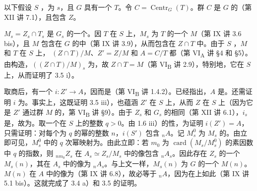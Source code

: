 以下假设 $S$ ，为 $s$，且 $G$ 具有一个 $T$。令 $C=\operatorname{Centr}_G(T)$。群 $C$ 是 $G$ 的（第 XII 讲 7.1），且包含 $Z$。

 $M_s=Z_s\cap T_s$ 是 $G_s$ 的一个。因 $T$ 在 $S$ 上，$M_s$ 为 $T$ 的一个 $M$（第 IX 讲 3.6 bis），且 $M$ 包含在 $G$ 的中（第 IX 讲 3.9），从而包含在 $Z\cap T$ 中。由于 $S$ ，$M$ 和 $T$ 在 $S$ 上， $(Z\cap T)/M$、$Z'=Z/M$ 和 $A=C/T$ 都（第 VI\textsubscript{A} 讲 §4 和 §5）。由构造，$((Z\cap T)/M)_s$ 为，故 $Z\cap T=M$（第 VI\textsubscript{B} 讲 2.9），特别地，它在 $S$ 上，从而证明了 3.5 i）。

取商后，有一个 $i:Z'\to A$，因而是（第 VI\textsubscript{B} 讲 1.4.2）。已经指出，$A$ 是。还需证明 $i$ 为。事实上，这既证明 3.5 iii），也蕴涵 $Z'$ 在 $S$ 上，从而 $Z$ 在 $S$ 上（因为它是 $Z'$ 通过群 $M$ 的，第 VI\textsubscript{B} 讲 §9）。由于 $Z_s$ 和 $G_s$ 的相同（第 XII 讲 6.1），$i_s$ 是，故为。取一个在 $S$ 上的整数 $q>0$。由 1.6 iii）的性，为证明 $i(Z')=A$，只需证明：对每个为 $q$ 的幂的整数 $n$，$i(S')$ 包含 ${}_nA$。记 $M_s^0$ 为 $M_s$ 的。由立即可见，$M_s^0$ 中的 $q$ 次幂映射为。由此立即：若 $m_0$ 为 $\operatorname{card}(M_s/M_s^0)$ 的素因数中 $q$ 的指数，则 ${}_{nm_0}Z_s$ 在 $A_s\simeq Z_s/M_s$ 中的像包含 ${}_nA_s$。因此存在 $Z_s$ 的一个 $M_s(n)$，其在 $A_s$ 中的像为 ${}_nA_s$。与上文一样，$M_s(n)$ 为 $G$ 的一个 $M(n)$。$M(n)$ 在 $A$ 中的像为（第 IX 讲
6.8），故必等于 ${}_nA$，因为在上如此（第 IX 讲 5.1 bis）。这就完成了 3.4 a）和 3.5 的证明。


